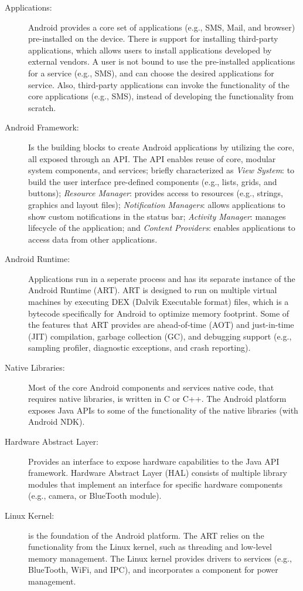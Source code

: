 \begin{description}
    \item[Applications:] Android provides a core set of applications (e.g., SMS, Mail, and browser) pre-installed on the device. There is support for installing third-party applications, which allows users to install applications developed by external vendors. A user is not bound to use the pre-installed applications for a service (e.g., SMS), and can choose the desired applications for service. Also, third-party applications can invoke the functionality of the core applications (e.g., SMS), instead of developing the functionality from scratch. 
    \item[Android Framework:] Is the building blocks to create Android applications by utilizing the core, all exposed through an API. The API enables reuse of core, modular system components, and services; briefly characterized as \textit{View System}: to build the user interface pre-defined components (e.g., lists, grids, and buttons); \textit{Resource Manager}: provides access to resources (e.g., strings, graphics and layout files); \textit{Notification Managers}: allows applications to show custom notifications in the status bar; \textit{Activity Manager}: manages lifecycle of the application; and \textit{Content Providers}: enables applications to access data from other applications.
    \item[Android Runtime:] Applications run in a seperate process and has its separate instance of the Android Runtime (ART). ART is designed to run on multiple virtual machines by executing DEX (Dalvik Executable format) files, which is a bytecode specifically for Android to optimize memory footprint. Some of the features that ART provides are ahead-of-time (AOT) and just-in-time (JIT) compilation, garbage collection (GC), and debugging support (e.g., sampling profiler, diagnostic exceptions, and crash reporting).
    \item[Native Libraries:] Most of the core Android components and services native code, that requires native libraries, is written in C or C++. The Android platform exposes Java APIs to some of the functionality of the native libraries (with Android NDK).   
    \item[Hardware Abstract Layer:] Provides an interface to expose hardware capabilities to the Java API framework. Hardware Abstract Layer (HAL) consists of multiple library modules that implement an interface for specific hardware components (e.g., camera, or BlueTooth module).
    \item[Linux Kernel:] is the foundation of the Android platform. The ART relies on the functionality from the Linux kernel, such as threading and low-level memory management. The Linux kernel provides drivers to services (e.g., BlueTooth, WiFi, and IPC), and incorporates a component for power management. 
\end{description} 



